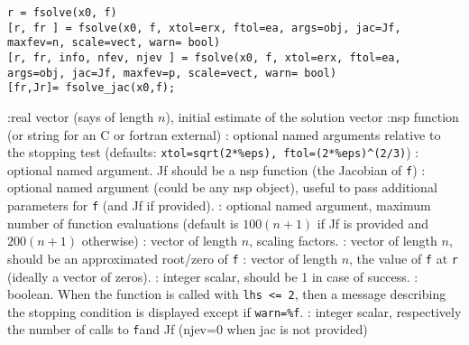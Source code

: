 
\begin{mandesc}
\end{mandesc}

\begin{calling_sequence}
\begin{verbatim}
r = fsolve(x0, f)
[r, fr ] = fsolve(x0, f, xtol=erx, ftol=ea, args=obj, jac=Jf, maxfev=n, scale=vect, warn= bool) 
[r, fr, info, nfev, njev ] = fsolve(x0, f, xtol=erx, ftol=ea, args=obj, jac=Jf, maxfev=p, scale=vect, warn= bool) 
[fr,Jr]= fsolve_jac(x0,f);
\end{verbatim}
\end{calling_sequence}
\begin{parameters}
  \begin{varlist}
    :real vector (says of length $n$), initial estimate of the solution vector
    :nsp function (or string for an C or fortran external)
    : optional named arguments relative to the stopping test (defaults:
    \verb+xtol=sqrt(2*%eps), ftol=(2*%eps)^(2/3)+)
    : optional named argument. Jf should be a nsp function (the Jacobian of \verb+f+)
    : optional named argument (could be any nsp object), useful to pass additional parameters for \verb+f+ (and
    Jf if provided).
    : optional named argument, maximum number of function evaluations (default is $100(n+1)$ if Jf is
    provided and $200(n+1)$ otherwise)
    : vector of length $n$, scaling factors.
    : vector of length $n$, should be an approximated root/zero of \verb+f+ 
    : vector of length $n$, the value of \verb+f+  at \verb+r+ (ideally a vector of zeros).
    : integer scalar, should be 1 in case of success.
    : boolean. When the function is called with \verb+lhs <= 2+, then a message describing the 
    stopping condition is displayed except if \verb+warn=%f+.
    : integer scalar, respectively the number of calls to \verb+f+and Jf (njev=0 when jac is not provided)
  \end{varlist}
\end{parameters}

